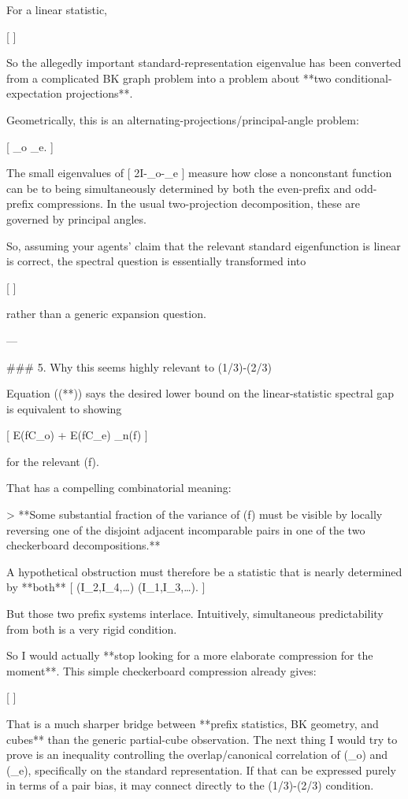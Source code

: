 For a linear statistic,

[
\tag{***}
]

So the allegedly important standard-representation eigenvalue has been converted from a complicated BK graph problem into a problem about **two conditional-expectation projections**.

Geometrically, this is an alternating-projections/principal-angle problem:

[
\Pi_o
\quad{}\quad
{}\Pi_e.
]

The small eigenvalues of
[
2I-\Pi_o-\Pi_e
]
measure how close a nonconstant function can be to being simultaneously determined by both the even-prefix and odd-prefix compressions. In the usual two-projection decomposition, these are governed by principal angles.

So, assuming your agents' claim that the relevant standard eigenfunction is linear is correct, the spectral question is essentially transformed into

[
]

rather than a generic expansion question.

---

### 5. Why this seems highly relevant to (1/3)-(2/3)

Equation ((**)) says the desired lower bound on the linear-statistic spectral gap is equivalent to showing

[
\mathbb E\Var(f\mid C_o)
+
\mathbb E\Var(f\mid C_e)
\gtrsim
\alpha_n\Var(f)
]

for the relevant (f).

That has a compelling combinatorial meaning:

> **Some substantial fraction of the variance of (f) must be visible by locally reversing one of the disjoint adjacent incomparable pairs in one of the two checkerboard decompositions.**

A hypothetical obstruction must therefore be a statistic that is nearly determined by **both**
[
(I_2,I_4,\ldots)
\quad{}\quad
(I_1,I_3,\ldots).
]

But those two prefix systems interlace. Intuitively, simultaneous predictability from both is a very rigid condition.

So I would actually **stop looking for a more elaborate compression for the moment**. This simple checkerboard compression already gives:

[
]

That is a much sharper bridge between **prefix statistics, BK geometry, and cubes** than the generic partial-cube observation. The next thing I would try to prove is an inequality controlling the overlap/canonical correlation of (\Pi_o) and (\Pi_e), specifically on the standard representation. If that can be expressed purely in terms of a pair bias, it may connect directly to the (1/3)-(2/3) condition.
